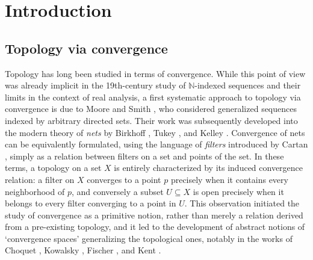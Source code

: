 \maketitle

\vspace{-1em}

\setcounter{tocdepth}{2} 
\tableofcontents

\section*{Introduction}\label{sec:intro}

\subsection*{Topology via convergence}Topology has long been studied in terms of convergence. While this point of view was already implicit in the 19th-century study of $\mathbb N$-indexed sequences and their limits in the context of real analysis, a first systematic approach to topology via convergence is due to Moore and Smith \cite{mooreGeneralTheoryLimits1922}, who considered generalized sequences indexed by arbitrary directed sets. Their work was subsequently developed into the modern theory of \emph{nets} by Birkhoff \cite{birkhoffMooreSmithConvergenceGeneral1937}, Tukey \cite{tukeyConvergenceUniformityTopology1940}, and Kelley \cite{kelleyConvergenceTopology1950,kelleyGeneralTopology1955}. 
%
Convergence of nets can be equivalently formulated, using the language of \emph{filters} introduced by Cartan \cite{cartanTheorieFiltres1937,cartanFiltresUltrafiltres1937}, simply as a relation between filters on a set and points of the set. In these terms, a topology on a set $X$ is entirely characterized by its induced convergence relation: a filter on $X$ converges to a point $p$ precisely when it contains every neighborhood of $p$, and conversely a subset $U \subseteq X$ is open precisely when it belongs to every filter converging to a point in $U$. This observation initiated the study of convergence as a primitive notion, rather than merely a relation derived from a pre-existing topology, and it led to the development of abstract notions of `convergence spaces' generalizing the topological ones, notably in the works of Choquet \cite{choquetConvergence1948}, Kowalsky \cite{kowalskyLimesraumeUndKomplettierung1954}, Fischer \cite{fischerLimesraume1959}, and Kent \cite{kentConvergenceFunctionsTheir1964}.

